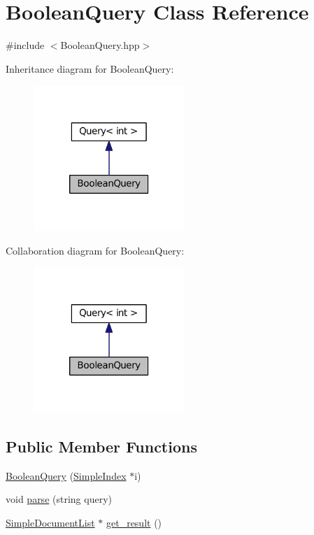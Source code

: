 \hypertarget{class_boolean_query}{\section{Boolean\-Query Class Reference}
\label{class_boolean_query}
}


{\ttfamily \#include $<$Boolean\-Query.\-hpp$>$}



Inheritance diagram for Boolean\-Query\-:\nopagebreak
\begin{figure}[H]
\begin{center}
\leavevmode
\includegraphics[width=162pt]{class_boolean_query__inherit__graph}
\end{center}
\end{figure}


Collaboration diagram for Boolean\-Query\-:\nopagebreak
\begin{figure}[H]
\begin{center}
\leavevmode
\includegraphics[width=162pt]{class_boolean_query__coll__graph}
\end{center}
\end{figure}
\subsection*{Public Member Functions}
\begin{DoxyCompactItemize}
\item 
\hyperlink{class_boolean_query_a576898eaed31cc7b31a66f826648a4da}{Boolean\-Query} (\hyperlink{class_simple_index}{Simple\-Index} $\ast$i)
\item 
void \hyperlink{class_boolean_query_ab6481d05cb528f55db63774b5d35d4b2}{parse} (string query)
\item 
\hyperlink{class_simple_document_list}{Simple\-Document\-List} $\ast$ \hyperlink{class_boolean_query_abdead8a7212547dcc8d745d11b678165}{get\-\_\-result} ()
\end{DoxyCompactItemize}


